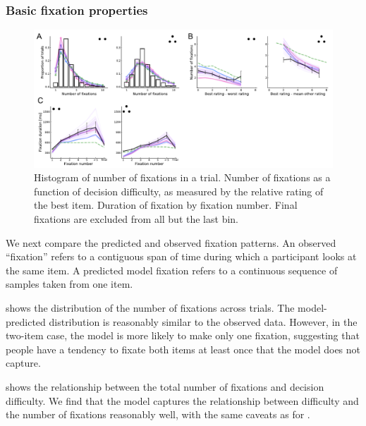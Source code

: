 \subsubsection{Basic fixation properties}


\begin{figure}[t!]
  \centering
  \includegraphics[width=\textwidth]{figs/attention/Fig4.pdf}
  \caption{
   Histogram of number of fixations in a trial.
   Number of fixations as a function of decision difficulty, as measured by the relative rating of the best item.
   Duration of fixation by fixation number. Final fixations are excluded from all but the last bin.
  }
  \label{fig:attention4}
\end{figure}

 
We next compare the predicted and observed fixation patterns. An observed ``fixation'' refers to a contiguous span of time during which a participant looks at the same item. A predicted model fixation refers to a continuous sequence of samples taken from one item.


 shows the distribution of the number of fixations across trials. The model-predicted distribution is reasonably similar to the observed data. However, in the two-item case, the model is more likely to make only one fixation, suggesting that people have a tendency to fixate both items at least once that the model does not capture. 

 shows the relationship between the total number of fixations and decision difficulty. We find that the model captures the relationship between difficulty and the number of fixations reasonably well, with the same caveats as for .

